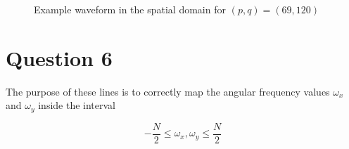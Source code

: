 \documentclass[12pt]{article}
\begin{document}
		\begin{figure}[!htb]
			\centering
			\scalebox{.5}{}
			\caption{Example waveform in the spatial domain for $(p,q)=(69,120)$}
			\label{fig:}
	  	\end{figure}
	  	
	
	\section{Question 6}
	
		The purpose of these lines is to correctly map the angular frequency values $\omega_x$ and $\omega_y$ inside the interval
		
		\begin{equation}
			-\frac{N}{2} \leq \omega_x, \omega_y \leq \frac{N}{2}
		\end{equation}

	
\end{document}
